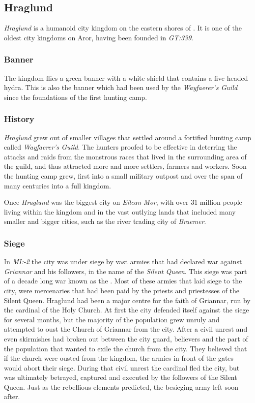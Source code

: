 \subsection{Hraglund}
\label{sec:Hraglund}

\emph{Hraglund} is a humanoid city kingdom on the eastern shores of
. It is one of the oldest city kingdoms on Aror,
having been founded in \emph{GT:339}.

\subsubsection*{Banner}

The kingdom flies a green banner with a white shield that contains a five
headed hydra. This is also the banner which had been used by the
\emph{Wayfaerer's Guild} since the foundations of the first hunting camp.

\subsubsection*{History}

\emph{Hraglund} grew out of smaller villages that settled around a fortified
hunting camp called \emph{Wayfaerer's Guild}. The hunters proofed to be
effective in deterring the attacks and raids from the monstrous races that
lived in the surrounding area of the guild, and thus attracted more and more
settlers, farmers and workers. Soon the hunting camp grew, first into a small
military outpost and over the span of many centuries into a full kingdom.

Once \emph{Hraglund} was the biggest city on \emph{Eilean Mor}, with over
31 million people living within the kingdom and in the vast outlying lands
that included many smaller and bigger cities, such as the river trading city
of \emph{Braemer}.

\subsubsection*{Siege}

In \emph{MI:-2} the city was under siege by vast armies that had declared war
against \emph{Griannar} and his followers, in the name of the
\emph{Silent Queen}. This siege was part of a decade long war known as the
. Most of these armies that laid siege to the city,
were mercenaries that had been paid by the priests and priestesses of the
Silent Queen. Hraglund had been a major centre for the faith of Griannar, run
by the cardinal of the Holy Church. At first the city defended itself against
the siege for several months, but the majority of the population grew unruly
and attempted to oust the Church of Griannar from the city. After a civil
unrest and even skirmishes had broken out between the city guard, believers
and the part of the population that wanted to exile the church from the
city. They believed that if the church were ousted from the kingdom, the
armies in front of the gates would abort their siege. During that civil unrest
the cardinal fled the city, but was ultimately betrayed, captured and executed
by the followers of the Silent Queen. Just as the rebellious elements
predicted, the besieging army left soon after.

